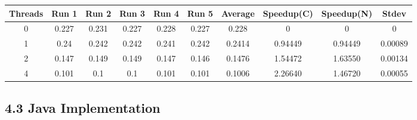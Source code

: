 \begin{itemize}
\begin{center}
 \begin{adjustbox}{width=\columnwidth, center} 
 \begin{tabular}{ | |c | c c c c c | c | c c | c | |} \hline 
 Threads & Run 1 & Run 2 & Run 3 & Run 4 & Run 5 & Average & Speedup(C) & Speedup(N) & Stdev \\ [0.5ex] 
 \hline 
 \hline 
0& 0.227 & 0.231 & 0.227 & 0.228 & 0.227 & 0.228 & 0 & 0 & 0\\ 
 \hline
1& 0.24 & 0.242 & 0.242 & 0.241 & 0.242 & 0.2414 & 0.94449 & 0.94449 & 0.00089\\ 
 \hline
2& 0.147 & 0.149 & 0.149 & 0.147 & 0.146 & 0.1476 & 1.54472 & 1.63550 & 0.00134\\ 
 \hline
4& 0.101 & 0.1 & 0.1 & 0.101 & 0.101 & 0.1006 & 2.26640 & 1.46720 & 0.00055\\ 
 \hline
\end{tabular} 
 \end{adjustbox} 
 \end{center} 
\end{itemize}
\subsection*{4.3 Java Implementation}
